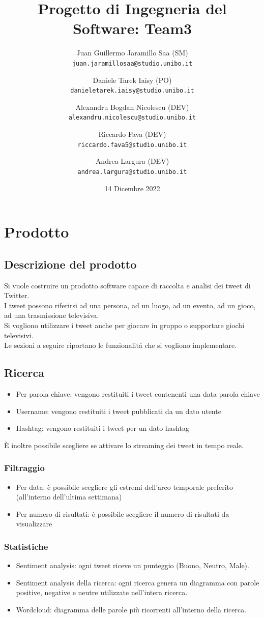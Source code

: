 \documentclass{article}
\title{Progetto di Ingegneria del Software: Team3}
\author{Juan Guillermo Jaramillo Saa (SM)\\
  \texttt{juan.jaramillosaa@studio.unibo.it}
  \and
  Daniele Tarek Iaisy (PO)\\
  \texttt{danieletarek.iaisy@studio.unibo.it}
  \and
  Alexandru Bogdan Nicolescu (DEV)\\
  \texttt{alexandru.nicolescu@studio.unibo.it}
  \and
  Riccardo Fava (DEV)\\
  \texttt{riccardo.fava5@studio.unibo.it}
  \and
  Andrea Largura (DEV)\\
  \texttt{andrea.largura@studio.unibo.it}}
\date{14 Dicembre 2022}
\begin{document}
\maketitle
\pagebreak
\tableofcontents
\pagebreak
\section{Prodotto}
\subsection{Descrizione del prodotto}
Si vuole costruire un prodotto software capace di raccolta e analisi dei tweet di Twitter. \\ 
I tweet possono riferirsi ad una persona, ad un luogo, ad un evento, ad un gioco, ad una trasmissione televisiva. \\
Si vogliono utilizzare i tweet anche per giocare in gruppo o supportare giochi televisivi. \\
Le sezioni a seguire riportano le funzionalit\'a che si vogliono implementare.
\subsection{Ricerca}
\begin{itemize}
    \item Per parola chiave: vengono restituiti i tweet contenenti una data parola chiave
    \item Username: vengono restituiti i tweet pubblicati da un dato utente
    \item Hashtag: vengono restituiti i tweet per un dato hashtag
\end{itemize}
È inoltre possibile scegliere se attivare lo streaming dei tweet in tempo reale.
\subsubsection{Filtraggio}
\begin{itemize}
    \item Per data: è possibile scegliere gli estremi dell’arco temporale preferito (all’interno dell’ultima settimana)
    \item Per numero di risultati: è possibile scegliere il numero di risultati da visualizzare
\end{itemize}

\subsubsection{Statistiche}
\begin{itemize}
    \item Sentiment analysis: ogni tweet riceve un punteggio (Buono, Neutro, Male).
    \item Sentiment analysis della ricerca: ogni ricerca genera un diagramma con parole positive, negative e neutre utilizzate nell'intera ricerca.
    \item Wordcloud: diagramma delle parole più ricorrenti all’interno della ricerca.
\end{itemize}
\end{document}
